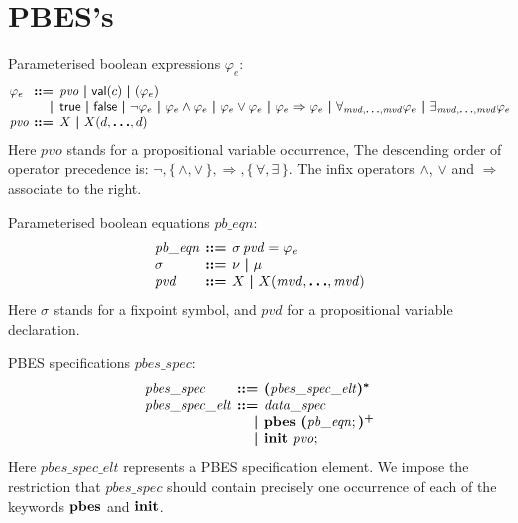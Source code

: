 \documentclass[a4paper,fleqn,10pt]{article}
\makeatletter
\newcommand{\f}[1]{\ensuremath{\mathit{#1}}}
\newenvironment{tightarray}[1]
  {\setlength{\arraycolsep}{2pt}%
   \begin{array}{@{}#1@{}}%
  }
  {\end{array}%
  }
\newcommand{\set}[1]{\ensuremath{\{\,#1\,\}}}
\newcommand{\limp}{\ensuremath{\Rightarrow}}
\newcommand{\mb}[1]{\text{\boldmath$#1$}}
\newcommand{\kwinit}{{\bf init}}
\newcommand{\kwpbes}{{\bf pbes}}
\makeatother
\begin{document}
\section{PBES's}

Parameterised boolean expressions $\varphi_e$:
\[\begin{tightarray}{lrl}
\varphi_e & \mb{::=} & \f{pvo}\ \mb{|}\ 
                       \mathsf{val}(c)\ \mb{|}\ 
                       ( \varphi_e )\\ 
          & \mb{|}   & \mathsf{true}\ \mb{|}\ 
                       \mathsf{false}\ \mb{|}\ 
                       \neg \varphi_e\ \mb{|}\ 
                       \varphi_e \land \varphi_e\ \mb{|}\ 
                       \varphi_e \lor \varphi_e\ \mb{|}\ 
                       \varphi_e \limp \varphi_e\ \mb{|}\ 
                       \forall_{\f{mvd},\mb{\ldots},\f{mvd}} \varphi_e\ \mb{|}\ 
                       \exists_{\f{mvd},\mb{\ldots},\f{mvd}} \varphi_e\\ 
\f{pvo}  & \mb{::=} & X\ \mb{|}\ X(d,\mb{\ldots},d)\\
\end{tightarray}\]
Here $\f{pvo}$ stands for a propositional variable occurrence,
The descending order of operator precedence is: $\neg, \set{\land, \lor}, \limp, \set{\forall, \exists}$.  
The infix operators $\land$, $\lor$ and $\limp$ associate to the right.

Parameterised boolean equations $\f{pb\_eqn}$:
\[\begin{tightarray}{lrl}
\f{pb\_eqn} & \mb{::=} & \sigma\,\f{pvd} = \varphi_e\\
\sigma      & \mb{::=} & \nu\ \mb{|}\ \mu\\
\f{pvd}     & \mb{::=} & X\ \mb{|}\ X(\f{mvd},\mb{\ldots},\f{mvd})\\
\end{tightarray}\]
Here $\sigma$ stands for a fixpoint symbol, and $\f{pvd}$ for a propositional variable declaration.

PBES specifications $\f{pbes\_spec}$:
\[\begin{tightarray}{lrl}
\f{pbes\_spec}      & \mb{::=} & \mb{(}\f{pbes\_spec\_elt}\mb{)^{*}}\\
\f{pbes\_spec\_elt} & \mb{::=} & \f{data\_spec}\\
                    & \mb{|} & \kwpbes\ \mb{(}\f{pb\_eqn};\mb{)^{+}}\\
                    & \mb{|} & \kwinit\ \f{pvo};
\end{tightarray}\]
Here $\f{pbes\_spec\_elt}$ represents a PBES specification element. We impose the restriction that $\f{pbes\_spec}$ should contain precisely one occurrence of each of the keywords $\kwpbes$ and $\kwinit$.
\end{document}

